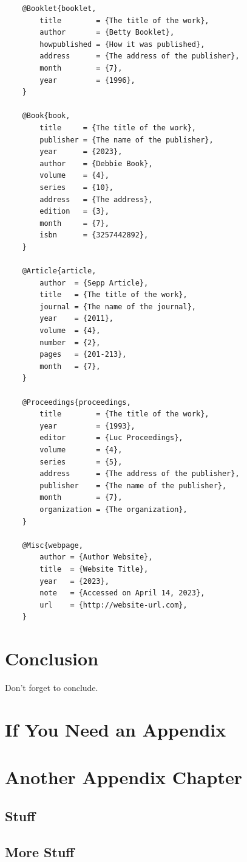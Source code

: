 \documentclass[12pt,final,a4paper,oneside]{book}
\begin{document}
{\begin{verbatim}
	@Booklet{booklet,
		title        = {The title of the work},
		author       = {Betty Booklet},
		howpublished = {How it was published},
		address      = {The address of the publisher},
		month        = {7},
		year         = {1996},
	}
	
	@Book{book,
		title     = {The title of the work},
		publisher = {The name of the publisher},
		year      = {2023},
		author    = {Debbie Book},
		volume    = {4},
		series    = {10},
		address   = {The address},
		edition   = {3},
		month     = {7},
		isbn      = {3257442892},
	}
	
	@Article{article,
		author  = {Sepp Article},
		title   = {The title of the work},
		journal = {The name of the journal},
		year    = {2011},
		volume  = {4},
		number  = {2},
		pages   = {201-213},
		month   = {7},
	}
	
	@Proceedings{proceedings,
		title        = {The title of the work},
		year         = {1993},
		editor       = {Luc Proceedings},
		volume       = {4},
		series       = {5},
		address      = {The address of the publisher},
		publisher    = {The name of the publisher},
		month        = {7},
		organization = {The organization},
	}
	
	@Misc{webpage,
		author = {Author Website},
		title  = {Website Title},
		year   = {2023},
		note   = {Accessed on April 14, 2023},
		url    = {http://website-url.com},
	}
\end{verbatim}
}

\chapter{Conclusion}

Don't forget to conclude.


	

\appendix

\chapter{If You Need an Appendix}

\chapter{Another Appendix Chapter}
\section{Stuff}	
\section{More Stuff}
\end{document}
